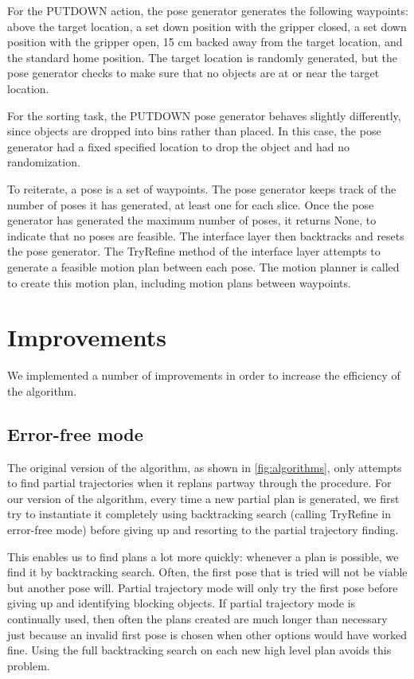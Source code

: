 \documentclass[12pt]{article}
\begin{document}
For the PUTDOWN action, the pose generator generates the following waypoints: above the target location, a set down position with the gripper closed, a set down position with the gripper open, 15 cm backed away from the target location, and the standard home position. 
The target location is randomly generated, but the pose generator checks to make sure that no objects are at or near the target location.

For the sorting task, the PUTDOWN pose generator behaves slightly differently, since objects are dropped into bins rather than placed.
In this case, the pose generator had a fixed specified location to drop the object and had no randomization.

To reiterate, a pose is a set of waypoints. 
The pose generator keeps track of the number of poses it has generated, at least one for each slice. 
Once the pose generator has generated the maximum number of poses, it returns None, to indicate that no poses are feasible. 
The interface layer then backtracks and resets the pose generator. 
The TryRefine method of the interface layer attempts to generate a feasible motion plan between each pose.  
The motion planner is called to create this motion plan, including motion plans between waypoints.

\section{Improvements}

We implemented a number of improvements in order to increase the efficiency of the algorithm.

\subsection{Error-free mode}

The original version of the algorithm, as shown in \ref{fig:algorithms}, only attempts to find partial trajectories when it replans partway through the procedure.  
For our version of the algorithm, every time a new partial plan is generated, we first try to instantiate it completely using backtracking search (calling TryRefine in error-free mode) before giving up and resorting to the partial trajectory finding. 

This enables us to find plans a lot more quickly: whenever a plan is possible, we find it by backtracking search.  
Often, the first pose that is tried will not be viable but another pose will.  
Partial trajectory mode will only try the first pose before giving up and identifying blocking objects.
If partial trajectory mode is continually used, then often the plans created are much longer than necessary just because an invalid first pose is chosen when other options would have worked fine.
Using the full backtracking search on each new high level plan avoids this problem.
\end{document}
